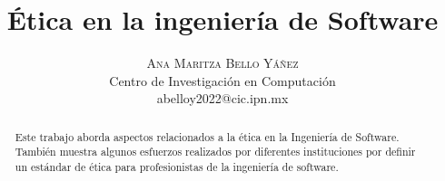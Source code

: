 \documentclass[twoside]{article}
\title{\vspace{-15mm}\fontsize{24pt}{10pt}\selectfont\textbf{Ética en la
ingeniería de Software}}
\author{
\large
\textsc{Ana Maritza Bello Yáñez} \\
\normalsize Centro de Investigación en Computación \\ 
\normalsize {abelloy2022@cic.ipn.mx}
\vspace{-5mm}
}
\date{}
\begin{document}
\maketitle %

\thispagestyle{fancy} %


\begin{abstract}

\noindent Este trabajo aborda aspectos relacionados a la ética en la Ingeniería
de Software. También muestra algunos esfuerzos realizados por diferentes
instituciones por definir un estándar de ética para profesionistas de la
ingeniería de software.

\end{abstract}

\end{document}
